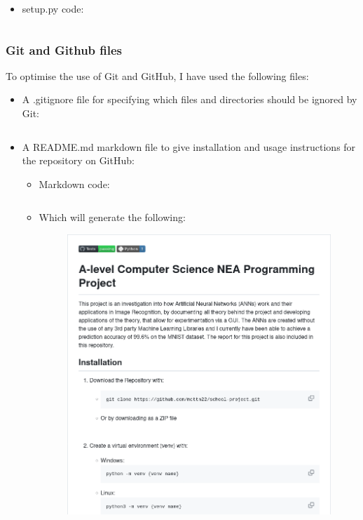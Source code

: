 \documentclass[./project-report/src/latex/project-report.tex]{subfiles}
\begin{document}
\begin{itemize}
    \item setup.py code:
        \inputminted{python}{./setup.py}
\end{itemize}

\subsubsection{Git and Github files}

To optimise the use of Git and GitHub, I have used the following files:

\begin{itemize}
    \item A .gitignore file for specifying which files and directories should be ignored by Git:
        \inputminted{text}{./.gitignore}
    \item A README.md markdown file to give installation and usage instructions for the repository on GitHub:
        \begin{itemize}
            \item Markdown code:
                \inputminted{markdown}{./README.md}
            \item Which will generate the following:
                \pagebreak
                \begin{figure}[h!]
                \centering
                \includegraphics[width=1\textwidth]{./project-report/src/images/readme-top.png}

\end{figure}
\end{itemize}
\end{itemize}
\end{document}
